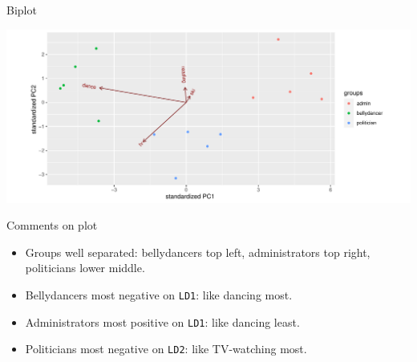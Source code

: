 \documentclass[
  ignorenonframetext,
]{beamer}
\newenvironment{Shaded}{\begin{snugshade}}{\end{snugshade}}
\newcommand{\DataTypeTok}[1]{\textcolor[rgb]{0.13,0.29,0.53}{#1}}
\newcommand{\FloatTok}[1]{\textcolor[rgb]{0.00,0.00,0.81}{#1}}
\newcommand{\KeywordTok}[1]{\textcolor[rgb]{0.13,0.29,0.53}{\textbf{#1}}}
\newcommand{\NormalTok}[1]{#1}
\newcommand{\OperatorTok}[1]{\textcolor[rgb]{0.81,0.36,0.00}{\textbf{#1}}}
\begin{document}
\begin{frame}[fragile]{Biplot}
\protect\hypertarget{biplot}{}

\begin{Shaded}
\end{Shaded}

\includegraphics{slides_d29_files/figure-beamer/unnamed-chunk-330-1.pdf}

\end{frame}

\begin{frame}[fragile]{Comments on plot}
\protect\hypertarget{comments-on-plot}{}

\begin{itemize}
\item
  Groups well separated: bellydancers top left, administrators top
  right, politicians lower middle.
\item
  Bellydancers most negative on \texttt{LD1}: like dancing most.
\item
  Administrators most positive on \texttt{LD1}: like dancing least.
\item
  Politicians most negative on \texttt{LD2}: like TV-watching most.
\end{itemize}

\end{frame}
\end{document}

